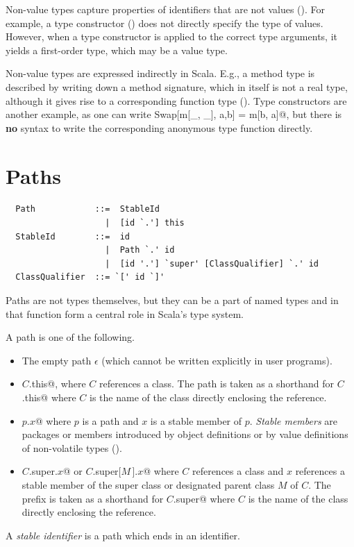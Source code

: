 Non-value types capture properties of identifiers that are not values
(). For example, a type constructor () does not directly specify the type of values. However, when a type constructor is applied to the correct type arguments, it yields a first-order type, which may be a value type. 

Non-value types are expressed indirectly in Scala. E.g., a method type is described by writing down a method signature, which in itself is not a real type, although it  gives rise to a corresponding function type (). Type constructors are another example, as one can write \lstinline@type Swap[m[_, _], a,b] = m[b, a]@, but there is \textbf{no} syntax to write the corresponding anonymous type function directly.

\section{Paths}\label{sec:paths}\label{sec:stable-ids}

\syntax\begin{lstlisting}
  Path            ::=  StableId
                    |  [id `.'] this
  StableId        ::=  id
                    |  Path `.' id
                    |  [id '.'] `super' [ClassQualifier] `.' id
  ClassQualifier  ::= `[' id `]'
\end{lstlisting}

Paths are not types themselves, but they can be a part of named types
and in that function form a central role in Scala's type system.

A path is one of the following.
\begin{itemize}
\item
The empty path $\epsilon$ (which cannot be written explicitly in user programs).
\item
\lstinline@$C$.this@, where $C$ references a class. 
The path  is taken as a shorthand for \lstinline@$C$.this@ where 
$C$ is the name of the class directly enclosing the reference. 
\item
\lstinline@$p$.$x$@ where $p$ is a path and $x$ is a stable member of $p$.
{\em Stable members} are packages or members introduced by object definitions or 
by value definitions of non-volatile types
(). 

\item
\lstinline@$C$.super.$x$@ or \lstinline@$C$.super[$M\,$].$x$@
where $C$ references a class and $x$ references a 
stable member of the super class or designated parent class $M$ of $C$. 
The prefix  is taken as a shorthand for \lstinline@$C$.super@ where 
$C$ is the name of the class directly enclosing the reference. 
\end{itemize}
A {\em stable identifier} is a path which ends in an identifier.

